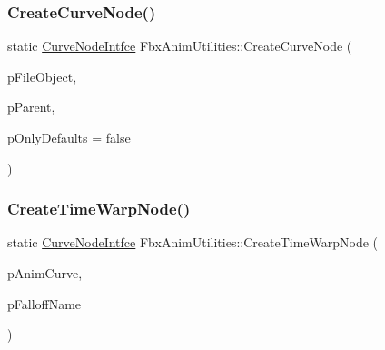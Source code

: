 \mbox{\label{class_fbx_anim_utilities_a321e3ca8208ab899a5bb93ee2ae37a35}} 
\subsubsection{\texorpdfstring{Create\+Curve\+Node()}{CreateCurveNode()}\hspace{0.1cm}{\footnotesize\ttfamily [3/3]}}
{\footnotesize\ttfamily static \hyperlink{class_fbx_anim_utilities_1_1_curve_node_intfce}{Curve\+Node\+Intfce} Fbx\+Anim\+Utilities\+::\+Create\+Curve\+Node (\begin{DoxyParamCaption}\item[{\hyperlink{class_fbx_i_o}{Fbx\+IO} $\ast$}]{p\+File\+Object,  }\item[{\hyperlink{class_fbx_anim_utilities_1_1_curve_node_intfce}{Curve\+Node\+Intfce} \&}]{p\+Parent,  }\item[{bool}]{p\+Only\+Defaults = {\ttfamily false} }\end{DoxyParamCaption})\hspace{0.3cm}{\ttfamily [static]}}

\mbox{\label{class_fbx_anim_utilities_aad2561a0cb51decf1de8d1bdaf5ae288}} 
\subsubsection{\texorpdfstring{Create\+Time\+Warp\+Node()}{CreateTimeWarpNode()}}
{\footnotesize\ttfamily static \hyperlink{class_fbx_anim_utilities_1_1_curve_node_intfce}{Curve\+Node\+Intfce} Fbx\+Anim\+Utilities\+::\+Create\+Time\+Warp\+Node (\begin{DoxyParamCaption}\item[{\hyperlink{class_fbx_anim_curve}{Fbx\+Anim\+Curve} $\ast$}]{p\+Anim\+Curve,  }\item[{const char $\ast$}]{p\+Falloff\+Name }\end{DoxyParamCaption})\hspace{0.3cm}{\ttfamily [static]}}

